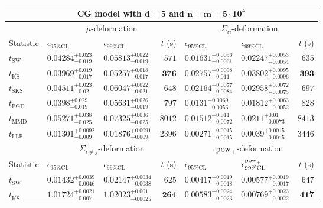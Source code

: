 \begin{tabular}{l|llr|llr}
	\toprule
	\multicolumn{7}{c}{{\bf CG model with $\mathbf{d=5}$ and $\mathbf{n=m=5\cdot 10^{4}}$}} \\
	\toprule
	\multicolumn{1}{c}{} & \multicolumn{3}{c}{$\mu$-deformation} & \multicolumn{3}{c}{$\Sigma_{ii}$-deformation} \\
	Statistic & $\epsilon_{95\%\mathrm{CL}}$ & $\epsilon_{99\%\mathrm    {CL}}$ & $t$ (s) & $\epsilon_{95\%\mathrm{CL}}$ & $\epsilon_{99\%\mathrm{CL}}$ & $t$ (s) \\
	\midrule
	$t_{\mathrm{SW}}$ & $0.04284_{-0.019}^{+0.023}$ & $0.05813_{-0.019}^{+0.022}$ & $571$ & $0.01631_{-0.0061}^{+0.0056}$ & $0.02247_{-0.0054}^{+0.0053}$ & $635$ \\
	$t_{\overline{\mathrm{KS}}}$ & ${\mathbf{0.03969_{-0.017}^{+0.019}}}$ & ${\mathbf{0.05257_{-0.017}^{+0.018}}}$ & ${\mathbf{376}}$ & $0.02757_{-0.011}^{+0.0098}$ & $0.03802_{-0.0096}^{+0.0095}$ & ${\mathbf{393}}$ \\
	$t_{\mathrm{SKS}}$ & $0.04511_{-0.02}^{+0.023}$ & $0.06047_{-0.021}^{+0.022}$ & $648$ & $0.02164_{-0.0084}^{+0.0077}$ & $0.02958_{-0.0075}^{+0.0072}$ & $697$ \\
	$t_{\mathrm{FGD}}$ & $0.0398_{-0.019}^{+0.029}$ & $0.05631_{-0.019}^{+0.026}$ & $797$ & ${\mathbf{0.0131_{-0.0056}^{+0.0069}}}$ & ${\mathbf{0.01812_{-0.0052}^{+0.0063}}}$ & $828$ \\
	$t_{\mathrm{MMD}}$ & $0.05271_{-0.025}^{+0.038}$ & $0.07325_{-0.025}^{+0.036}$ & $8012$ & $0.01512_{-0.0072}^{+0.011}$ & $0.0211_{-0.0073}^{+0.01}$ & $8413$ \\
	$t_{\mathrm{LLR}}$ & $0.01301_{-0.009}^{+0.0092}$ & $0.01876_{-0.009}^{+0.0091}$ & $2396$ & $0.00271_{-0.0015}^{+0.0015}$ & $0.0039_{-0.0015}^{+0.0015}$ & $3446$ \\
	\toprule
	\multicolumn{1}{c}{} & \multicolumn{3}{c}{$\Sigma_{i\neq j}$-deformation} & \multicolumn{3}{c}{$\rm{pow}_{+}$-deformation} \\
	Statistic & $\epsilon_{95\%\mathrm{CL}}$ & $\epsilon_{99\%\mathrm{CL}}$ & $t$ (s) & $\epsilon_{95\%\mathrm{CL}}$ & $\epsilon^{\rm   {pow}_{+}}_{99\%\mathrm{CL}}$ & $t$ (s) \\
	\midrule
	$t_{\mathrm{SW}}$ & $0.01432_{-0.0046}^{+0.0039}$ & $0.02147_{-0.0038}^{+0.0034}$ & $625$ & $0.00417_{-0.0018}^{+0.0019}$ & $0.00577_{-0.0017}^{+0.0019}$ & $647$ \\
	$t_{\overline{\mathrm{KS}}}$ & $1.01724_{-0.007}^{+0.0021}$ & $1.02023_{-0.0025}^{+0.001}$ & ${\mathbf{264}}$ & $0.00583_{-0.0023}^{+0.0024}$ & $0.00769_{-0.0022}^{+0.0023}$ & ${\mathbf{417}}$ \\

\end{tabular}
